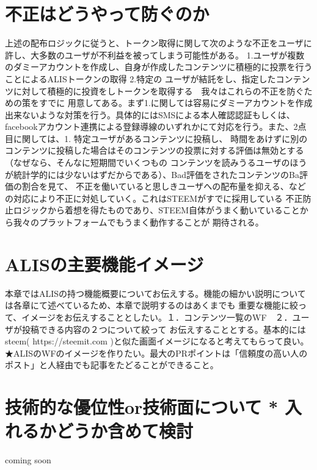 \documentclass{jsarticle}
\begin{document}
\section{不正はどうやって防ぐのか}
上述の配布ロジックに従うと、トークン取得に関して次のような不正をユーザに許し、大多数のユーザが不利益を被ってしまう可能性がある。
1.ユーザが複数のダミーアカウントを作成し、自身が作成したコンテンツに積極的に投票を行うことによるALISトークンの取得 2.特定の
ユーザが結託をし、指定したコンテンツに対して積極的に投資をしトークンを取得する　我々はこれらの不正を防ぐための策をすでに
用意してある。まず1.に関しては容易にダミーアカウントを作成出来ないような対策を行う。具体的にはSMSによる本人確認認証もしくは、
facebookアカウント連携による登録導線のいずれかにて対応を行う。また、2点目に関しては、1. 特定ユーザがあるコンテンツに投稿し、
時間をあけずに別のコンテンツに投稿した場合はそのコンテンツの投票に対する評価は無効とする（なぜなら、そんなに短期間でいくつもの
コンテンツを読みうるユーザのほうが統計学的には少ないはずだからである）、Bad評価をされたコンテンツのBa評価の割合を見て、
不正を働いていると思しきユーザへの配布量を抑える、などの対応により不正に対処していく。これはSTEEMがすでに採用している
不正防止ロジックから着想を得たものであり、STEEM自体がうまく動いていることから我々のプラットフォームでもうまく動作することが
期待される。
\section{ALISの主要機能イメージ}
本章ではALISの持つ機能概要についてお伝えする。機能の細かい説明については各章にて述べているため、本章で説明するのはあくまでも
重要な機能に絞って、イメージをお伝えすることとしたい。１．コンテンツ一覧のWF　２．ユーザが投稿できる内容の２つについて絞って
お伝えすることとする。基本的にはsteem( https://steemit.com )と似た画面イメージになると考えてもらって良い。
★ALISのWFのイメージを作りたい。最大のPRポイントは「信頼度の高い人のポスト」と人経由でも記事をたどることができること。
\section{技術的な優位性or技術面について * 入れるかどうか含めて検討}
coming soon
\end{document}

